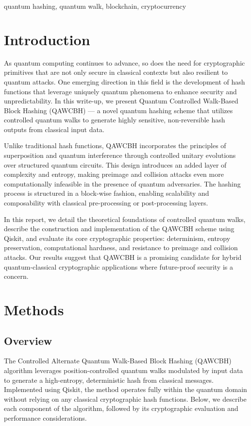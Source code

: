 \documentclass[conference]{IEEEtran}
\begin{document}
\begin{IEEEkeywords}
quantum hashing, quantum walk, blockchain, cryptocurrency
\end{IEEEkeywords}

\section{Introduction}
As quantum computing continues to advance, so does the need for cryptographic primitives that are not only secure in classical contexts but also resilient to quantum attacks. One emerging direction in this field is the development of hash functions that leverage uniquely quantum phenomena to enhance security and unpredictability. In this write-up, we present Quantum Controlled Walk-Based Block Hashing (QAWCBH) — a novel quantum hashing scheme that utilizes controlled quantum walks to generate highly sensitive, non-reversible hash outputs from classical input data.

Unlike traditional hash functions, QAWCBH incorporates the principles of superposition and quantum interference through controlled unitary evolutions over structured quantum circuits. This design introduces an added layer of complexity and entropy, making preimage and collision attacks even more computationally infeasible in the presence of quantum adversaries. The hashing process is structured in a block-wise fashion, enabling scalability and composability with classical pre-processing or post-processing layers.

In this report, we detail the theoretical foundations of controlled quantum walks, describe the construction and implementation of the QAWCBH scheme using Qiskit, and evaluate its core cryptographic properties: determinism, entropy preservation, computational hardness, and resistance to preimage and collision attacks. Our results suggest that QAWCBH is a promising candidate for hybrid quantum-classical cryptographic applications where future-proof security is a concern.


\section{Methods}

\subsection{Overview}

The Controlled Alternate Quantum Walk-Based Block Hashing (QAWCBH) algorithm leverages position-controlled quantum walks modulated by input data to generate a high-entropy, deterministic hash from classical messages. Implemented using Qiskit, the method operates fully within the quantum domain without relying on any classical cryptographic hash functions. Below, we describe each component of the algorithm, followed by its cryptographic evaluation and performance considerations.
\end{document}
